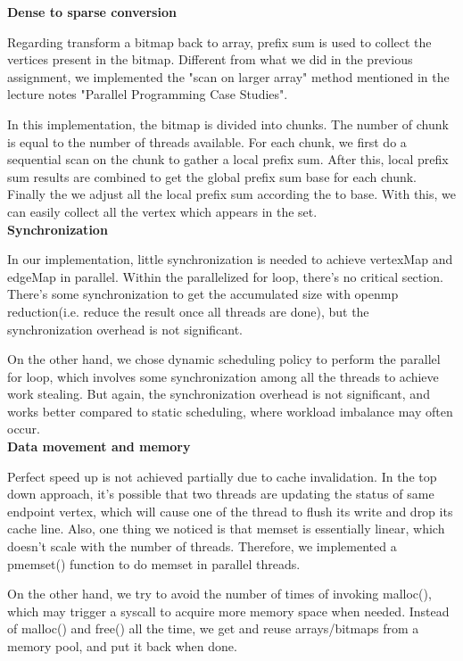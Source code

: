 \documentclass[11pt]{article}
\begin{document}
\textbf{Dense to sparse conversion}

Regarding transform a bitmap back to array, prefix sum is used to collect the vertices present in the bitmap. Different from what we did in the previous assignment, we implemented the "scan on larger array" method mentioned in the lecture notes "Parallel Programming Case Studies". 

In this implementation, the bitmap is divided into chunks. The number of chunk is equal to the number of threads available. For each chunk, we first do a sequential scan on the chunk to gather a local prefix sum. After this, local prefix sum results are combined to get the global prefix sum base for each chunk. Finally the we adjust all the local prefix sum according the to base. With this, we can easily collect all the vertex which appears in the set. \\

\textbf{Synchronization}

In our implementation, little synchronization is needed to achieve vertexMap and edgeMap in parallel. Within the parallelized for loop, there's no critical section. There's some synchronization to get the accumulated size with openmp reduction(i.e. reduce the result once all threads are done), but the synchronization overhead is not significant. 

On the other hand, we chose dynamic scheduling policy to perform the parallel for loop, which involves some synchronization among all the threads to achieve work stealing. But again, the synchronization overhead is not significant, and works better compared to static scheduling, where workload imbalance may often occur. \\

\textbf{Data movement and memory}

Perfect speed up is not achieved partially due to cache invalidation. In the top down approach, it's possible that two threads are updating the status of same endpoint vertex, which will cause one of the thread to flush its write and drop its cache line. Also, one thing we noticed is that memset is essentially linear, which doesn't scale with the number of threads. Therefore, we implemented a pmemset() function to do memset in parallel threads. 

On the other hand, we try to avoid the number of times of invoking malloc(), which may trigger a syscall to acquire more memory space when needed. Instead of malloc() and free() all the time, we get and reuse arrays/bitmaps from a memory pool, and put it back when done. \\




\clearpage
\end{document}
